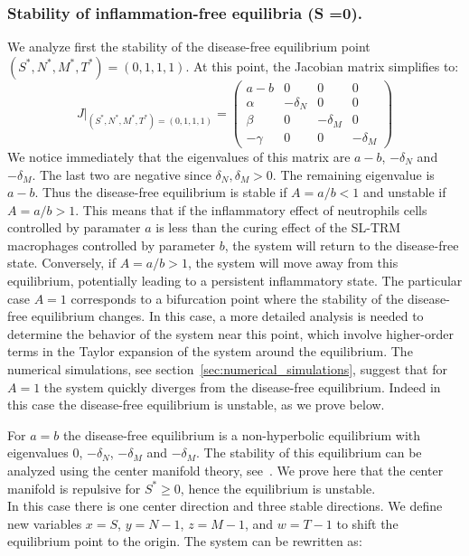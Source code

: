 \documentclass[a4paper, 12pt]{article}
\begin{document}
\subsubsection{Stability of  inflammation-free equilibria (S =0).}\label{sec:stab}
We analyze first the stability of the disease-free equilibrium point $(S^*, N^*, M^*, T^*) = (0, 1, 1, 1)$.
At this point, the Jacobian matrix simplifies to:
\[
J|_{(S^*, N^*, M^*, T^*) = (0, 1, 1, 1)} =
\begin{pmatrix}
a - b & 0 & 0 & 0 \\
\alpha & - \delta_N & 0 & 0 \\
\beta & 0 & -\delta_M & 0 \\
-\gamma & 0 & 0 & -\delta_M
\end{pmatrix}
\]
We notice immediately that the eigenvalues of this matrix are  $a-b$, $-\delta_N$ and $-\delta_M$.
 The last two are negative since $\delta_N, \delta_M > 0$. The remaining eigenvalue  is $a-b$. Thus the disease-free equilibrium is stable if $A = a/b < 1$ and unstable if $A =a/b > 1$. 
This means that if the inflammatory effect of neutrophils cells controlled by paramater $a$ is less than the curing effect of the  SL-TRM macrophages controlled by parameter $b$, the system will return to the disease-free state.
 Conversely, if $A=a/b > 1$, the system will move away from this equilibrium, potentially leading to a persistent inflammatory state.
The particular case $A=1$ corresponds to a bifurcation point where the stability of the disease-free equilibrium changes. In this case, a more detailed analysis is needed to determine the behavior of the system near this point, which  involve higher-order terms in the Taylor expansion of the system around the equilibrium.
The numerical simulations, see section~\ref{sec:numerical_simulations}, suggest that for $A=1$ the system quickly diverges from the disease-free equilibrium. 
Indeed in this case the disease-free equilibrium is unstable, as we prove below.
\par For $a=b$ the disease-free equilibrium is a non-hyperbolic equilibrium with eigenvalues $0$, $-\delta_N$, $-\delta_M$ and $-\delta_M$. 
The stability of this equilibrium can be analyzed using the center manifold theory, see~\cite{perko}. We prove here that the center manifold is repulsive for $S^* \geq 0$, hence the equilibrium is unstable.\\
In this case there is one center direction and three stable directions. We define new variables $x=S$, $y=N-1$, $z=M-1$, and $w=T-1$ to shift the equilibrium point to the origin. The system can be rewritten as:
\end{document}
